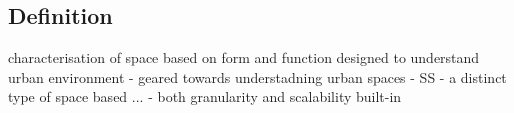\subsection{Definition}
\label{ssec:ss_def}


characterisation of space based on form and function designed to understand urban environment
- geared towards understadning urban spaces
- SS - a distinct type of space based ...
- both granularity and scalability built-in

















